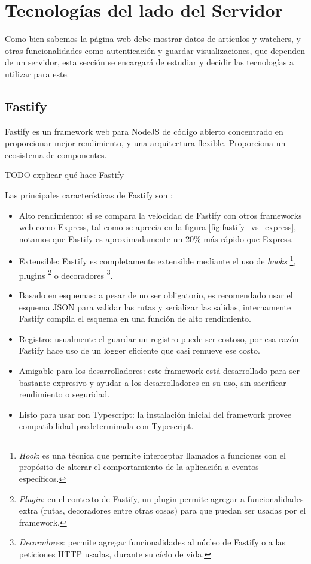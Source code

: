 \section{Tecnologías del lado del Servidor}

Como bien sabemos la página web debe mostrar datos de artículos y watchers, y otras funcionalidades como autenticación y guardar visualizaciones, que dependen de un servidor, esta sección se encargará de estudiar y decidir las tecnologías a utilizar para este.

\subsection{Fastify}

Fastify es un framework web para NodeJS de código abierto concentrado en proporcionar mejor rendimiento, y una arquitectura flexible. Proporciona un ecosistema de componentes.

TODO explicar qué hace Fastify

Las principales características de Fastify son \cite{FastifyCoreFeatures}:

\begin{itemize}
    \item Alto rendimiento: si se compara la velocidad de Fastify con otros frameworks web como Express, tal como se aprecia en la figura \ref{fig:fastify_vs_express}, notamos que Fastify es aproximadamente un 20\% más rápido que Express.
    \item Extensible: Fastify es completamente extensible mediante el uso de \textit{hooks} \footnote{\textit{Hook}: es una técnica que permite interceptar llamados a funciones con el propósito de alterar el comportamiento de la aplicación a eventos específicos.}, plugins \footnote{\textit{Plugin}: en el contexto de Fastify, un plugin permite agregar a funcionalidades extra (rutas, decoradores entre otras cosas) para que puedan ser usadas por el framework.} o decoradores \footnote{\textit{Decoradores}: permite agregar funcionalidades al núcleo de Fastify o a las peticiones HTTP usadas, durante su cíclo de vida.}.
    \item Basado en esquemas: a pesar de no ser obligatorio, es recomendado usar el esquema JSON para validar las rutas y serializar las salidas, internamente Fastify compila el esquema en una función de alto rendimiento.
    \item Registro: usualmente el guardar un registro puede ser costoso, por esa razón Fastify hace uso de un logger eficiente que casi remueve ese costo.
    \item Amigable para los desarrolladores: este framework está desarrollado para ser bastante expresivo y ayudar a los desarrolladores en su uso, sin sacrificar rendimiento o seguridad.
    \item Listo para usar con Typescript: la instalación inicial del framework provee compatibilidad predeterminada con Typescript.
\end{itemize}


